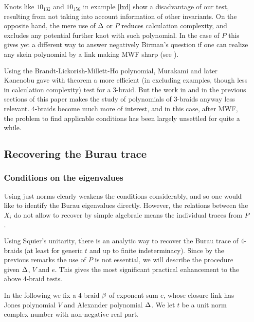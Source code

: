 Knots like $10_{132}$ and $10_{156}$ in example \ref{lxd} show
a disadvantage of our test, resulting from not taking into account
information of other invariants. On the opposite hand, the
mere use of $\Delta$ or $P$ reduces calculation complexity, and
excludes any potential further knot with such polynomial.
In the case of $P$ this gives yet a different way to
answer negatively Birman's question if one can realize any
skein polynomial by a link making MWF sharp (see \cite
{posex_bcr,3br}).

Using the Brandt-Lickorish-Millett-Ho polynomial, Murakami
\cite{Murakami} and later Kanenobu \cite{Kanenobu} gave with
theorem  a more
efficient (in excluding examples, though less in calculation
complexity) test for a 3-braid. But the work in \cite{3br} and
in the previous sections of this paper makes the study of 
polynomials of 3-braids anyway less relevant. $4$-braids
become much more of interest, and in this case, after MWF,
the problem to find applicable conditions has been largely
unsettled for quite a while.

\subsection{Recovering the Burau trace}

\subsubsection{Conditions on the eigenvalues}

Using just norms clearly weakens the conditions considerably,
and so one would like to identify the Burau eigenvalues directly.
However, the relations between the $X_i$ do not allow to recover 
by simple algebraic means the individual traces from $P$. 

Using Squier's unitarity, there is an analytic way to recover
the Burau trace of 4-braids (at least for generic $t$ and
up to finite indeterminacy). Since by the previous remarks
the use of $P$ is not essential, we will describe the
procedure given $\Delta$, $V$ and $e$. This gives the most
significant practical enhancement to the above 4-braid tests.

In the following we fix a 4-braid $\beta$ of exponent sum $e$, whose
closure link has Jones polynomial $V$ and Alexander polynomial $\Delta$.
We let $t$ be a unit norm complex number with non-negative real part.

